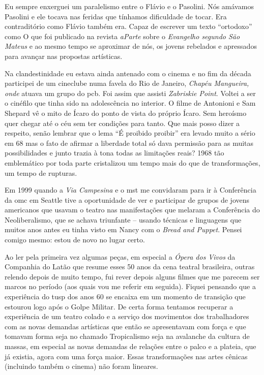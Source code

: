 Eu sempre enxerguei um paralelismo entre o Flávio e o Pasolini. Nós
amávamos Pasolini e ele tocava nas feridas que tínhamos dificuldade de
tocar. Era contraditório como Flávio também era. Capaz de escrever um
texto “ortodoxo” como O que foi publicado na revista {\it aParte} sobre
o {\it Evangelho segundo São Mateus} e ao mesmo tempo se aproximar de
nós, os jovens rebelados e apressados para avançar nas propostas
artísticas.

Na clandestinidade eu estava ainda antenado com o cinema e no fim da
década participei de um cineclube numa favela do Rio de Janeiro,
{\it Chapéu Mangueira, onde} atuava um grupo do {\sc pcb}. Foi assim que
assisti {\it Zabriskie Point}. Voltei a ser o cinéfilo que tinha sido na
adolescência no interior. O filme de Antonioni e Sam Shepard vê o mito
de Ícaro do ponto de vista do próprio Ícaro. Sem heroísmo quer chegar
até o céu sem ter condições para tanto. Que mais posso dizer a respeito,
senão lembrar que o lema “É proibido proibir” era levado muito a sério
em 68 mas o fato de afirmar a liberdade total só dava permissão para as
muitas possibilidades e junto trazia à tona todas as limitações reais?
1968 tão emblemático por toda parte cristalizou um tempo mais do que de
transformações, um tempo de rupturas.

Em 1999 quando a {\it Via Campesina} e o {\sc mst} me convidaram para ir
à Conferência da {\sc omc} em Seattle tive a oportunidade de ver e participar
de grupos de jovens americanos que usavam o teatro nas manifestações que
melaram a Conferência do Neoliberalismo, que se achava triunfante --
usando técnicas e linguagens que muitos anos antes eu tinha visto em
Nancy com o {\it Bread and Puppet}. Pensei comigo mesmo: estou de
novo no lugar certo.

\subject{***}

Ao ler pela primeira vez algumas peças, em especial a {\it Ópera dos
Vivos} da Companhia do Latão que resume esses 50 anos da cena teatral
brasileira, outras relendo depois de muito tempo, fui rever depois
alguns filmes que me parecem ser marcos no período (aos quais vou me
referir em seguida). Fiquei pensando que a experiência do {\sc tusp} dos anos
60 se encaixa em um momento de transição que estourou logo após o Golpe
Militar. De certa forma tentamos recuperar a experiência de um teatro
colado e a serviço dos movimentos dos trabalhadores com as novas
demandas artísticas que então se apresentavam com força e que tomavam
forma seja no chamado Tropicalismo seja na avalanche da cultura de
massas, em especial as novas demandas de relações entre o palco e a
plateia, que já existia, agora com uma força maior. Essas transformações
nas artes cênicas (incluindo também o cinema) não foram lineares.

